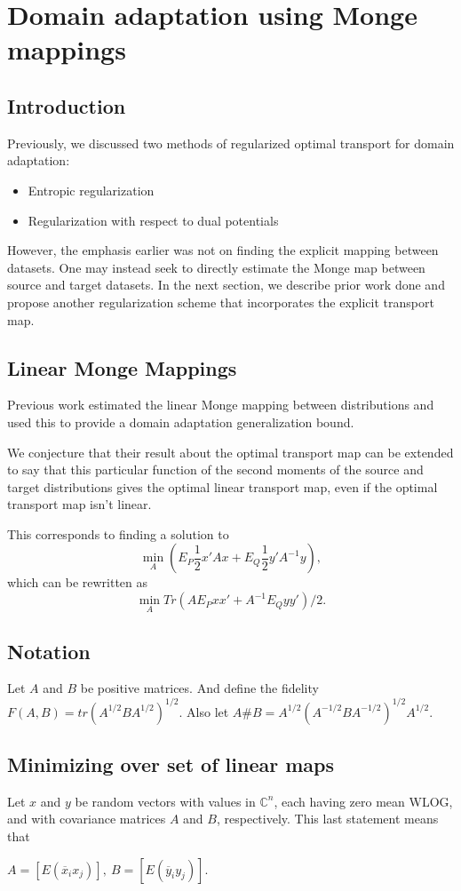 \chapter{Domain adaptation using Monge mappings}

\section*{Introduction}
Previously, we discussed two methods of regularized optimal transport for domain adaptation:
\begin{itemize}
	\item Entropic regularization
	\item Regularization with respect to dual potentials
\end{itemize}

However, the emphasis earlier was not on finding the explicit mapping between datasets. One may instead seek to directly estimate the Monge map between source and target datasets. In the next section, we describe prior work done and propose another regularization scheme that incorporates the explicit transport map.

\section*{Linear Monge Mappings}
Previous work \cite{Flamary2019} estimated the linear Monge mapping between distributions and used this to provide a domain adaptation generalization bound.

We conjecture that their result about the optimal transport map can be extended to say that this particular function of the second moments of the source and target distributions gives the optimal linear transport map, even if the optimal transport map isn't linear.

This corresponds to finding a solution to
$$\min_A (E_P \frac{1}{2} x'Ax + E_Q \frac{1}{2} y'A^{-1}y),$$ which can be rewritten as 
$$\min_A Tr(A E_P xx' + A^{-1} E_Q yy')/2.$$

\section*{Notation}

Let $A$ and $B$ be positive matrices. And define the fidelity $F(A,B) = tr(A^{1/2}BA^{1/2})^{1/2}$. Also let $A\#B=A^{1/2}(A^{-1/2}BA^{-1/2})^{1/2}A^{1/2}$.

\section*{Minimizing over set of linear maps \cite{Bhatia2019}}
Let $x$ and $y$ be random vectors with values in $\mathbb{C}^{n}$, each having zero mean WLOG, and with covariance matrices $A$ and $B$, respectively. This last statement means that
\begin{center}
	$A=[E(\overline{x}_{i}x_{j})],\ B=[E(\overline{y}_{i}y_{j})]$.
\end{center}

